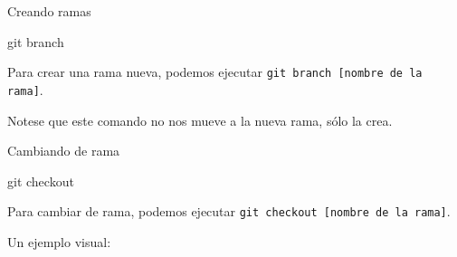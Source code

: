 \begin{frame}[t]{Creando ramas}
    \begin{comando}
        git branch
    \end{comando}

    \pause
    \begin{block}{}
        Para crear una rama nueva, podemos ejecutar \texttt{git branch [nombre de la rama]}.

        Notese que este comando no nos mueve a la nueva rama, sólo la crea.
    \end{block}


\end{frame}

\begin{frame}[t]{Cambiando de rama}
    \begin{comando}
        git checkout
    \end{comando}

    \pause
    \begin{block}{}
        Para cambiar de rama, podemos ejecutar \texttt{git checkout [nombre de la rama]}.
    \end{block}

    \pause
    \vspace{0.5em}
    Un ejemplo visual:


\end{frame}

